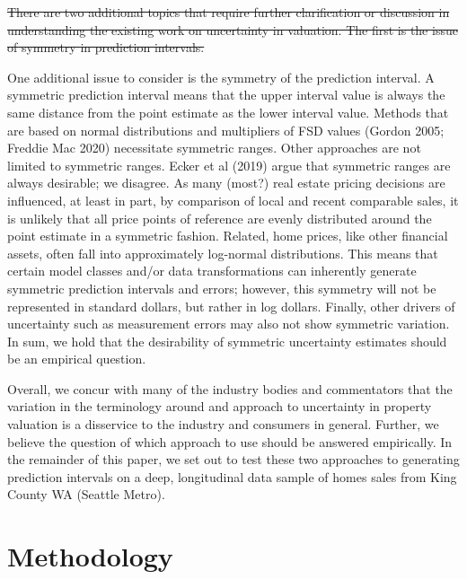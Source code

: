 \documentclass[colTwo]{anon}
\theoremstyle{definition}
\begin{document}
\st{There are two additional topics that require further clarification or discussion in understanding the existing work on uncertainty in valuation. The first is the issue of symmetry in prediction intervals.}  

One additional issue to consider is the symmetry of the prediction interval. A symmetric prediction interval means that the upper interval value is always the same distance from the point estimate as the lower interval value.  Methods that are based on normal distributions and multipliers of FSD values (Gordon 2005; Freddie Mac 2020) necessitate symmetric ranges. Other approaches are not limited to symmetric ranges.  Ecker et al (2019) argue that symmetric ranges are always desirable; we disagree.  As many (most?) real estate pricing decisions are influenced, at least in part, by comparison of local and recent comparable sales, it is unlikely that all price points of reference are evenly distributed around the point estimate in a symmetric fashion.  Related, home prices, like other financial assets, often fall into approximately log-normal distributions.  This means that certain model classes and/or data transformations can inherently generate symmetric prediction intervals and errors; however, this symmetry will not be represented in standard dollars, but rather in log dollars. Finally, other drivers of uncertainty such as measurement errors may also not show symmetric variation.  In sum, we hold that the desirability of symmetric uncertainty estimates should be an empirical question.  

Overall, we concur with many of the industry bodies and commentators that the variation in the terminology around and approach to uncertainty in property valuation is a disservice to the industry and consumers in general.  Further, we believe the question of which approach to use should be answered empirically.  In the remainder of this paper, we set out to test these two approaches to generating prediction intervals on a deep, longitudinal data sample of homes sales from King County WA (Seattle Metro).

\section{Methodology}
\end{document}
